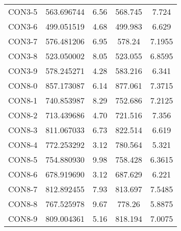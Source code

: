 \begin{table}[ht]
\begin{tabular}{c c c c c}
CON3-5 & 563.696744 & 6.56 & 568.745 & 7.724 \\
CON3-6 & 499.051519 & 4.68 & 499.983 & 6.629 \\
CON3-7 & 576.481206 & 6.95 & 578.24 & 7.1955 \\
CON3-8 & 523.050002 & 8.05 & 523.055 & 6.8595 \\
CON3-9 & 578.245271 & 4.28 & 583.216 & 6.341 \\
CON8-0 & 857.173087 & 6.14 & 877.061 & 7.3715 \\
CON8-1 & 740.853987 & 8.29 & 752.686 & 7.2125 \\
CON8-2 & 713.439686 & 4.70 & 721.516 & 7.356 \\
CON8-3 & 811.067033 & 6.73 & 822.514 & 6.619 \\
CON8-4 & 772.253292 & 3.12 & 780.564 & 5.321 \\
CON8-5 & 754.880930 & 9.98 & 758.428 & 6.3615 \\
CON8-6 & 678.919690 & 3.12 & 687.629 & 6.221 \\
CON8-7 & 812.892455 & 7.93 & 813.697 & 7.5485 \\
CON8-8 & 767.525978 & 9.67 & 778.26 & 5.8875 \\
CON8-9 & 809.004361 & 5.16 & 818.194 & 7.0075 \\
[1ex]\hline
\end{tabular}
\label{table:nonlin}
\end{table} \clearpage
